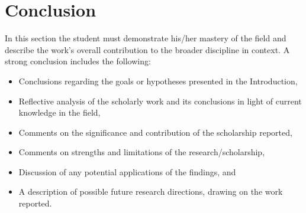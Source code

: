 \section{Conclusion}
In this section the student must demonstrate his/her mastery of the field and describe the work's overall contribution to the broader discipline in context. A strong conclusion includes the following:

\begin{itemize}
  \item Conclusions regarding the goals or hypotheses presented in the Introduction,
  \item Reflective analysis of the scholarly work and its conclusions in light of current knowledge in the field,
  \item Comments on the significance and contribution of the scholarship reported,
  \item Comments on strengths and limitations of the research/scholarship,
  \item Discussion of any potential applications of the findings, and
  \item A description of possible future research directions, drawing on the work reported.
\end{itemize}
